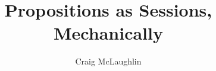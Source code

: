 \documentclass{mpaper}
\begin{document}
\title{Propositions as Sessions, Mechanically}
\author{Craig McLaughlin}

\maketitle









\sloppy
\printbibliography
\end{document}
